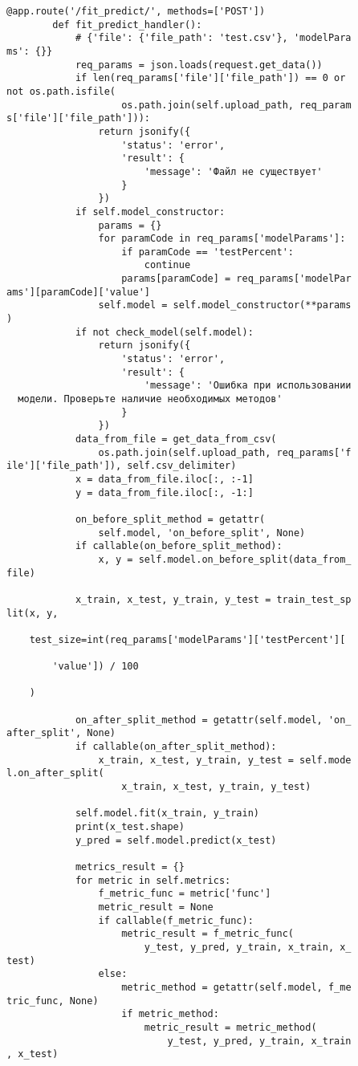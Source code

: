 \begin{lstlisting}[caption={Код backend-части приложения}, label={ls:a:01}]
        @app.route('/fit_predict/', methods=['POST'])
        def fit_predict_handler():
            # {'file': {'file_path': 'test.csv'}, 'modelPara
ms': {}}
            req_params = json.loads(request.get_data())
            if len(req_params['file']['file_path']) == 0 or
not os.path.isfile(
                    os.path.join(self.upload_path, req_param
s['file']['file_path'])):
                return jsonify({
                    'status': 'error',
                    'result': {
                        'message': 'Файл не существует'
                    }
                })
            if self.model_constructor:
                params = {}
                for paramCode in req_params['modelParams']:
                    if paramCode == 'testPercent':
                        continue
                    params[paramCode] = req_params['modelPar
ams'][paramCode]['value']
                self.model = self.model_constructor(**params
)
            if not check_model(self.model):
                return jsonify({
                    'status': 'error',
                    'result': {
                        'message': 'Ошибка при использовании
  модели. Проверьте наличие необходимых методов'
                    }
                })
            data_from_file = get_data_from_csv(
                os.path.join(self.upload_path, req_params['f
ile']['file_path']), self.csv_delimiter)
            x = data_from_file.iloc[:, :-1]
            y = data_from_file.iloc[:, -1:]

            on_before_split_method = getattr(
                self.model, 'on_before_split', None)
            if callable(on_before_split_method):
                x, y = self.model.on_before_split(data_from_
file)

            x_train, x_test, y_train, y_test = train_test_sp
lit(x, y,

    test_size=int(req_params['modelParams']['testPercent'][

        'value']) / 100

    )

            on_after_split_method = getattr(self.model, 'on_
after_split', None)
            if callable(on_after_split_method):
                x_train, x_test, y_train, y_test = self.mode
l.on_after_split(
                    x_train, x_test, y_train, y_test)

            self.model.fit(x_train, y_train)
            print(x_test.shape)
            y_pred = self.model.predict(x_test)

            metrics_result = {}
            for metric in self.metrics:
                f_metric_func = metric['func']
                metric_result = None
                if callable(f_metric_func):
                    metric_result = f_metric_func(
                        y_test, y_pred, y_train, x_train, x_
test)
                else:
                    metric_method = getattr(self.model, f_me
tric_func, None)
                    if metric_method:
                        metric_result = metric_method(
                            y_test, y_pred, y_train, x_train
, x_test)


\end{lstlisting}

